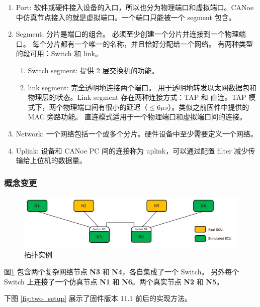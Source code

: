 \begin{enumerate}
    \item Port: 软件或硬件接入设备的入口，所以也分为物理端口和虚拟端口。CANoe 中仿真节点接入的就是虚拟端口。一个端口只能被一个 segment 包含。
    \item Segment: 分片是端口的组合。 必须至少创建一个分片并连接到一个物理端口。 每个分片都有一个唯一的名称，并且恰好分配给一个网络。 有两种类型的段可用：Switch 和 link。 
    \begin{enumerate}
        \item Switch segment: 提供 2 层交换机的功能。
        \item link segment: 完全透明地连接两个端口。 用于透明地转发以太网数据包和物理层的状态。Link segment 存在两种连接方式：TAP 和 直连。TAP 模式下，两个物理端口间有很小的延迟（$\leq 6 \mu s$）。类似之前固件中提供的 MAC 旁路功能。
        直连模式适用于一个物理端口和虚拟端口间的连接。
    \end{enumerate}

    \item Network: 一个网络包括一个或多个分片。硬件设备中至少需要定义一个网络。
    \item Uplink: 设备和 CANoe PC 间的连接称为 uplink，可以通过配置 filter 减少传输给上位机的数据量。
\end{enumerate}

\subsubsection{概念变更}

\begin{figure}[ht]
    \centering
    \includegraphics[scale=0.7]{pic/Snipaste_2021-10-29_14-37-48.png}
    \caption{拓扑实例}
    \label{fig:example_topology}
\end{figure}
图\ref{fig:example_topology} 包含两个复杂网络节点 \textbf{N3} 和 \textbf{N4}，各自集成了一个 Switch。
另外每个 Switch 上连接了一个仿真节点 \textbf{N1} 和  \textbf{N6}。两个真实节点  \textbf{N2} 和  \textbf{N5}。

下图 \ref{fig:two_setup} 展示了固件版本 11.1 前后的实现方法。

